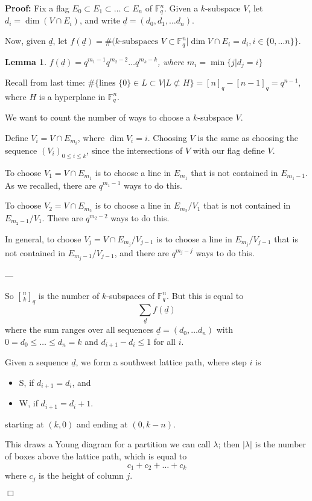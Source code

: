 \documentclass[11pt]{article}
\newtheorem{lemma}[theorem]{Lemma}
\newenvironment{proof}{\noindent \textbf{Proof:}}{$\Box$}
\newcommand{\F}{\mathbb F} %
\newcommand{\dd}{\underline{d}}
\newcommand{\qbinom}[2] {{#1 \brack #2}_q}
\begin{document}
\begin{proof}
 Fix a flag $E_0 \subset E_1 \subset \ldots \subset E_n$ of $\F_q^n$. Given a $k$-subspace $V$, let $d_i = \dim(V \cap E_i)$, and write $\dd = (d_0, d_1, \ldots d_n)$.

Now, given $\dd$, let $f(\dd) = \#(k \text{-subspaces } V \subset \F_q^n | \dim V \cap E_i = d_i, i \in \{0,\ldots n\} \}$.
\begin{lemma}
 $f(\dd) = q^{m_1 - 1} q^{m_2 - 2} \ldots q^{m_k-k}$, where $m_i = \min \{j | d_j = i \}$
\end{lemma}

Recall from last time: $\# \{ \text{lines } \{0\} \in L \subset V | L \not \subset H \} = [n]_q - [n-1]_q = q^{n-1}$, where $H$ is a hyperplane in $\F_q^n$.

We want to count the number of ways to choose a $k$-subspace $V$.

Define $V_i = V \cap E_{m_i}$, where $\dim V_i = i$. Choosing $V$ is the same as choosing the sequence $(V_i)_{0\le i \le k}$, since the intersections of $V$ with our flag define $V$.

To choose $V_1 = V \cap E_{m_1}$ is to choose a line in $E_{m_1}$ that is not contained in $E_{m_1-1}$. As we recalled, there are $q^{m_1-1}$ ways to do this.

To choose $V_2 = V \cap E_{m_2}$ is to choose a line in $E_{m_2}/V_1$ that is not contained in $E_{m_2-1}/V_1$. There are $q^{m_2-2}$ ways to do this.

In general, to choose $V_j = V \cap E_{m_j}/V_{j-1}$ is to choose a line in $E_{m_j}/V_{j-1}$ that is not contained in $E_{m_j-1}/V_{j-1}$, and there are $q^{m_j-j}$ ways to do this.

---

So $\qbinom{n}{k}$ is the number of $k$-subspaces of $\F_q^n$. But this is equal to 
$$
\sum_{\dd} {f(\dd)}
$$
where the sum ranges over all sequences $\dd = (d_0, \ldots d_n)$ with $0 = d_0 \le \dots \le d_n = k$ and $d_{i+1} - d_i \le 1$ for all $i$.

Given a sequence $\dd$, we form a southwest lattice path, where step $i$ is
\begin{itemize}
 \item S, if $d_{i+1} = d_i$, and
 \item W, if $d_{i+1} = d_i+1$.
\end{itemize}
starting at $(k,0)$ and ending at $(0, k-n)$.

This draws a Young diagram for a partition we can call $\lambda$; then $|\lambda|$ is the number of boxes above the lattice path, which is equal to $$c_1 + c_2 + \ldots + c_k$$ where $c_j$ is the height of column $j$.


\end{proof}
\end{document}
